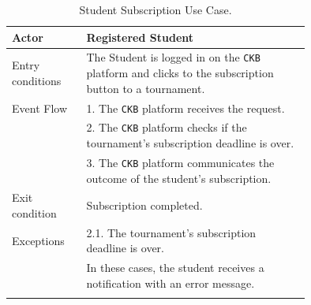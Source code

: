 \begin{center}
    \begin{longtable}{lp{0.75\linewidth}}
        \hline
        Actor            & Registered Student                                                                                                                                                                               \\
        \hline
        Entry conditions & The Student is logged in on the \verb|CKB| platform and clicks to the subscription button to a tournament.                                                                                                            \\
        \hline
        Event Flow       
        & 1. The \verb|CKB| platform receives the request.\\
        & 2. The \verb|CKB| platform checks if the tournament's subscription deadline is over.\\
        & 3. The \verb|CKB| platform communicates the outcome of the student's subscription.\\
        \hline
        Exit condition   & Subscription completed.   \\                                                                                                                                                                           
        \hline
        Exceptions   
        & 2.1. The tournament's subscription deadline is over.\\                                                                                                                                              
            & In these cases, the student receives a notification with an error message.   \\                                                               
        \hline
        \caption{Student Subscription Use Case.}
        \label{tab: student_subscription_use_case}
    \end{longtable}

\end{center}

